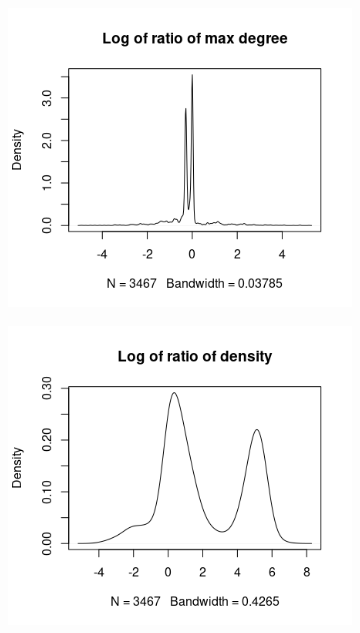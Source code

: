 \documentclass{l4proj}
\theoremstyle{definition}
\theoremstyle{remark}
\begin{document}
\begin{appendices}
\begin{figure}
\begin{subfigure}[t]{0.49\textwidth}
    \end{subfigure}
    \begin{subfigure}[t]{0.49\textwidth}
      \centering
      \includegraphics[width=\textwidth]{images/sip_ratio_maxdeg.png}
    \end{subfigure}
    \begin{subfigure}[t]{0.49\textwidth}
      \centering
      \includegraphics[width=\textwidth]{images/sip_ratio_density.png}
    \end{subfigure}

\end{figure}
\end{appendices}
\end{document}
